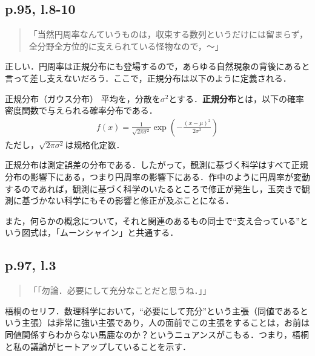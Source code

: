 \documentclass[10pt, a5paper, twoside]{ltjsarticle}
\begin{document}
        \subsection{p.95, l.8-10}

            \begin{quote}
                「当然円周率なんていうものは，収束する数列というだけには留まらず，全分野全方位的に支えられている怪物なので，〜」
            \end{quote}

            正しい．円周率は正規分布にも登場するので，あらゆる自然現象の背後にあると言って差し支えないだろう．ここで，正規分布は以下のように定義される\cite{tokei}．

            \begin{dfn}{正規分布（ガウス分布）}{}
                平均を\mu，分散を$\sigma^2$とする．\textbf{正規分布}とは，以下の確率密度関数で与えられる確率分布である．
                \begin{align*}
                    f(x) = \frac{1}{\sqrt{2 \pi \sigma^2}} \exp \left( - \frac{(x - \mu)^2}{2 \sigma^2}\right)
                \end{align*}
                ただし，$\sqrt{2 \pi \sigma^2}$は規格化定数．
            \end{dfn}

            正規分布は測定誤差の分布である．したがって，観測に基づく科学はすべて正規分布の影響下にある，つまり円周率の影響下にある．作中のように円周率が変動するのであれば，観測に基づく科学のいたるところで修正が発生し，玉突きで観測に基づかない科学にもその影響と修正が及ぶことになる．

            また，何らかの概念について，それと関連のあるもの同士で“支え合っている”という図式は，「ムーンシャイン」と共通する．

        \subsection{p.97, l.3}

            \begin{quote}
                「「勿論．必要にして充分なことだと思うね．」」
            \end{quote}

            梧桐のセリフ．数理科学において，“必要にして充分”という主張（同値であるという主張）は非常に強い主張であり，人の面前でこの主張をすることは，お前は同値関係すらわからない馬鹿なのか？というニュアンスがこもる．つまり，梧桐と私の議論がヒートアップしていることを示す．
\end{document}
